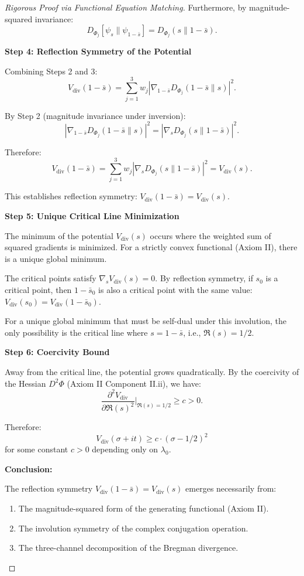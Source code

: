 \begin{theorem}
\begin{theorem}
\begin{proof}[Rigorous Proof via Functional Equation Matching]
Furthermore, by magnitude-squared invariance:
\[
D_{\Phi_j}[\psi_s \| \psi_{1-\bar{s}}] = D_{\Phi_j}(s \| 1-\bar{s}).
\]

\textbf{Step 4: Reflection Symmetry of the Potential}

Combining Steps 2 and 3:
\[
V_{\mathrm{div}}(1 - \bar{s}) = \sum_{j=1}^3 w_j |\nabla_{1-\bar{s}} D_{\Phi_j}(1-\bar{s} \| s)|^2.
\]

By Step 2 (magnitude invariance under inversion):
\[
|\nabla_{1-\bar{s}} D_{\Phi_j}(1-\bar{s} \| s)|^2 = |\nabla_s D_{\Phi_j}(s \| 1-\bar{s})|^2.
\]

Therefore:
\[
V_{\mathrm{div}}(1 - \bar{s}) = \sum_{j=1}^3 w_j |\nabla_s D_{\Phi_j}(s \| 1-\bar{s})|^2 = V_{\mathrm{div}}(s).
\]

This establishes reflection symmetry: $V_{\mathrm{div}}(1-\bar{s}) = V_{\mathrm{div}}(s)$.

\textbf{Step 5: Unique Critical Line Minimization}

The minimum of the potential $V_{\mathrm{div}}(s)$ occurs where the weighted sum of squared gradients is minimized. For a strictly convex functional (Axiom II), there is a unique global minimum.

The critical points satisfy $\nabla_s V_{\mathrm{div}}(s) = 0$. By reflection symmetry, if $s_0$ is a critical point, then $1 - \bar{s}_0$ is also a critical point with the same value: $V_{\mathrm{div}}(s_0) = V_{\mathrm{div}}(1-\bar{s}_0)$.

For a unique global minimum that must be self-dual under this involution, the only possibility is the critical line where $s = 1 - \bar{s}$, i.e., $\Re(s) = 1/2$.

\textbf{Step 6: Coercivity Bound}

Away from the critical line, the potential grows quadratically. By the coercivity of the Hessian $D^2\Phi$ (Axiom II Component II.ii), we have:
\[
\frac{\partial^2 V_{\mathrm{div}}}{\partial \Re(s)^2}\bigg|_{\Re(s)=1/2} \geq c > 0.
\]

Therefore:
\[
V_{\mathrm{div}}(\sigma + it) \geq c \cdot (\sigma - 1/2)^2
\]
for some constant $c > 0$ depending only on $\lambda_0$.

\textbf{Conclusion:}

The reflection symmetry $V_{\mathrm{div}}(1-\bar{s}) = V_{\mathrm{div}}(s)$ emerges necessarily from:
\begin{enumerate}
\item The magnitude-squared form of the generating functional (Axiom II).
\item The involution symmetry of the complex conjugation operation.
\item The three-channel decomposition of the Bregman divergence.
\end{enumerate}


\end{proof}
\end{theorem}
\end{theorem}
